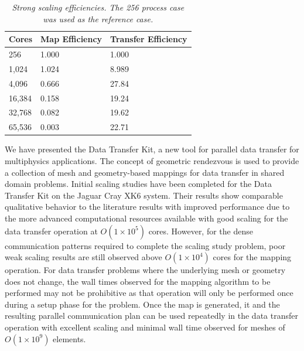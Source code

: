 \documentclass{mc2013}
\begin{document}
\begin{table}[htpb!]
  \begin{center}
    \begin{tabular}{lll}\hline\hline
      \multicolumn{1}{c}{Cores}& 
      \multicolumn{1}{c}{Map Efficiency} & 
      \multicolumn{1}{c}{Transfer Efficiency}\\\hline\hline
      256 &	1.000 &	1.000 \\
      1,024 &	1.024 &	8.989 \\
      4,096 &	0.666 &	27.84 \\
      16,384 &	0.158 &	19.24 \\
      32,768 &	0.082 &	19.62 \\
      65,536 &	0.003 &	22.71 \\
      \hline\hline
    \end{tabular}
  \end{center}
  \caption{\sl Strong scaling efficiencies. The 256 process case was used
    as the reference case.}
  \label{tab:strong_efficiency}
\end{table}


We have presented the Data Transfer Kit, a new tool for parallel data
transfer for multiphysics applications. The concept of geometric
rendezvous is used to provide a collection of mesh and geometry-based
mappings for data transfer in shared domain problems. Initial scaling
studies have been completed for the Data Transfer Kit on the Jaguar
Cray XK6 system. Their results show comparable qualitative behavior to
the literature results with improved performance due to the more
advanced computational resources available with good scaling for the
data transfer operation at $O(1 \times 10^5)$ cores. However, for the
dense communication patterns required to complete the scaling study
problem, poor weak scaling results are still observed above $O(1
\times 10^4)$ cores for the mapping operation. For data transfer
problems where the underlying mesh or geometry does not change, the
wall times observed for the mapping algorithm to be performed may not
be prohibitive as that operation will only be performed once during a
setup phase for the problem. Once the map is generated, it and the
resulting parallel communication plan can be used repeatedly in the
data transfer operation with excellent scaling and minimal wall time
observed for meshes of $O(1 \times 10^9)$ elements.
\end{document}
